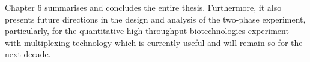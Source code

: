 \documentclass[11pt,a4paper]{article}
\begin{document}
Chapter 6 summarises and concludes the entire thesis. Furthermore, it also presents future directions in the design and analysis of the two-phase experiment, particularly, for the quantitative high-throughput biotechnologies experiment with multiplexing technology which is currently useful and will remain so for the next decade.   



\end{document}
